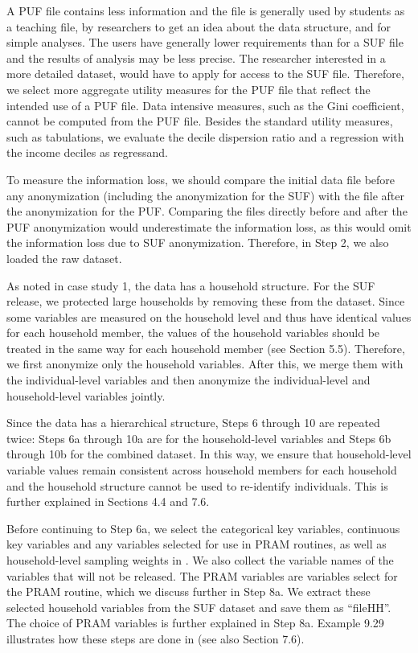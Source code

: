 \documentclass[letterpaper,10pt,english]{sphinxmanual}
\begin{document}

A PUF file contains less information and the file is generally used by
students as a teaching file, by researchers to get an idea about the
data structure, and for simple analyses. The users have generally lower
requirements than for a SUF file and the results of analysis may be less
precise. The researcher interested in a more detailed dataset, would
have to apply for access to the SUF file. Therefore, we select more
aggregate utility measures for the PUF file that reflect the intended
use of a PUF file. Data intensive measures, such as the Gini
coefficient, cannot be computed from the PUF file. Besides the standard
utility measures, such as tabulations, we evaluate the decile dispersion
ratio and a regression with the income deciles as regressand.

To measure the information loss, we should compare the initial data file
before any anonymization (including the anonymization for the SUF) with
the file after the anonymization for the PUF. Comparing the files
directly before and after the PUF anonymization would underestimate the
information loss, as this would omit the information loss due to SUF
anonymization. Therefore, in Step 2, we also loaded the raw dataset.


As noted in case study 1, the data has a household structure. For the
SUF release, we protected large households by removing these from the
dataset. Since some variables are measured on the household level and
thus have identical values for each household member, the values of the
household variables should be treated in the same way for each household
member (see Section 5.5). Therefore, we first anonymize only the
household variables. After this, we merge them with the individual-level
variables and then anonymize the individual-level and household-level
variables jointly.

Since the data has a hierarchical structure, Steps 6 through 10 are
repeated twice: Steps 6a through 10a are for the household-level
variables and Steps 6b through 10b for the combined dataset. In this
way, we ensure that household-level variable values remain consistent
across household members for each household and the household structure
cannot be used to re-identify individuals. This is further explained in
Sections 4.4 and 7.6.

Before continuing to Step 6a, we select the categorical key variables,
continuous key variables and any variables selected for use in PRAM
routines, as well as household-level sampling weights in . We also
collect the variable names of the variables that will not be released.
The PRAM variables are variables select for the PRAM routine, which we
discuss further in Step 8a. We extract these selected household
variables from the SUF dataset and save them as “fileHH”. The choice of
PRAM variables is further explained in Step 8a. Example 9.29 illustrates
how these steps are done in  (see also Section 7.6).
\end{document}
